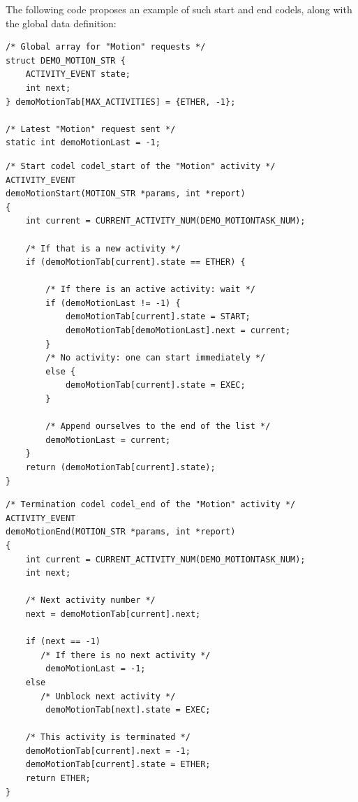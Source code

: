 The following  code  proposes an  example of such   start and end codels,
along with the global data definition:


\begin{center}\begin{cartouche}\small\begin{verbatim}
/* Global array for "Motion" requests */
struct DEMO_MOTION_STR {
    ACTIVITY_EVENT state;
    int next;
} demoMotionTab[MAX_ACTIVITIES] = {ETHER, -1};

/* Latest "Motion" request sent */
static int demoMotionLast = -1; 
\end{verbatim}\end{cartouche}\end{center}

\begin{center}\begin{cartouche}\small\begin{verbatim}
/* Start codel codel_start of the "Motion" activity */
ACTIVITY_EVENT
demoMotionStart(MOTION_STR *params, int *report)
{
    int current = CURRENT_ACTIVITY_NUM(DEMO_MOTIONTASK_NUM);

    /* If that is a new activity */
    if (demoMotionTab[current].state == ETHER) {

        /* If there is an active activity: wait */
        if (demoMotionLast != -1) {
            demoMotionTab[current].state = START;
            demoMotionTab[demoMotionLast].next = current;
        }
        /* No activity: one can start immediately */
        else {
            demoMotionTab[current].state = EXEC;
        }

        /* Append ourselves to the end of the list */
        demoMotionLast = current;
    }
    return (demoMotionTab[current].state);
}
\end{verbatim}\end{cartouche}\end{center}

\begin{center}\begin{cartouche}\small\begin{verbatim}
/* Termination codel codel_end of the "Motion" activity */
ACTIVITY_EVENT
demoMotionEnd(MOTION_STR *params, int *report)
{
    int current = CURRENT_ACTIVITY_NUM(DEMO_MOTIONTASK_NUM);
    int next;

    /* Next activity number */
    next = demoMotionTab[current].next;

    if (next == -1) 
       /* If there is no next activity */
        demoMotionLast = -1;
    else
       /* Unblock next activity */
        demoMotionTab[next].state = EXEC;

    /* This activity is terminated */
    demoMotionTab[current].next = -1;
    demoMotionTab[current].state = ETHER;
    return ETHER;
}
\end{verbatim}\end{cartouche}\end{center}

